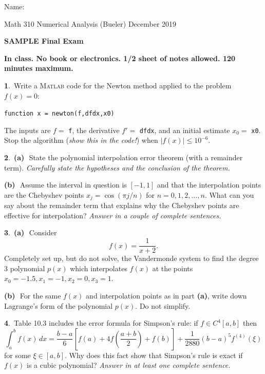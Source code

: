 \documentclass[11pt]{amsart}
\newcommand{\normalspacing}{\renewcommand{\baselinestretch}{1.05}
        \tiny\normalsize}
\newcommand{\prob}[1]{\bigskip\noindent\large\textbf{#1}.\,\normalsize }
\newcommand{\ppart}[1]{\textbf{(#1)}\,\, }
\newcommand{\epart}[1]{\medskip\noindent\textbf{(#1)}\,\, }
\newcommand{\pts}[1]{}
\newcommand{\Matlab}{\textsc{Matlab}\xspace}
\begin{document}
\hfill \Large Name:\underline{\phantom{Ed Bueler really really long long long name}}
\medskip

\scriptsize \noindent Math 310 Numerical Analysis (Bueler) \hfill December 2019
\medskip

\Large\centerline{\textbf{SAMPLE Final Exam}}

\smallskip
\large
\begin{center}
\textbf{In class.  No book or electronics.  1/2 sheet of notes allowed.  120 minutes maximum.}
\end{center}

\bigskip
\thispagestyle{empty}
\normalspacing

\prob{1} \pts{10} Write a \Matlab code for the Newton method applied to the problem $f(x)=0$:

\centerline{\texttt{function x = newton(f,dfdx,x0)}}

\noindent The inputs are $f=$ \texttt{f}, the derivative $f'=$ \texttt{dfdx}, and an initial estimate $x_0=$ \texttt{x0}.  Stop the algorithm (\emph{show this in the code!}) when $|f(x)| \le 10^{-6}$.
\vfill


\prob{2} \ppart{a} \pts{10} State the polynomial interpolation error theorem (with a remainder term).  \emph{Carefully state the hypotheses \emph{and} the conclusion of the theorem.}
\vspace{2.0in}

\epart{b} \pts{5}  Assume the interval in question is $[-1,1]$ and that the interpolation points are the Chebyshev points $x_j = \cos(\pi j/n)$ for $n=0,1,2,\dots,n$.  What can you say about the remainder term that explains why the Chebyshev points are effective for interpolation?  \emph{Answer in a couple of complete sentences.}
\vspace{1.0in}


\newpage
\prob{3} \ppart{a} \pts{10}   Consider
  $$f(x) = \frac{1}{x+2}.$$
Completely set up, but do not solve, the Vandermonde system to find the degree 3 polynomial $p(x)$ which interpolates $f(x)$ at the points $x_0=-1.5,x_1=-1,x_2=0,x_3=1$.
\vfill

\epart{b} \pts{10}  For the same $f(x)$ and interpolation points as in part \textbf{(a)}, write down Lagrange's form of the polynomial $p(x)$.   Do not simplify.
\vfill

\prob{4}  \pts{10}   Table 10.3 includes the error formula for Simpson's rule: if $f \in C^4[a,b]$ then
	$$\int_a^b f(x)\,dx = \frac{b-a}{6} \left[f(a) + 4 f\left(\frac{a+b}{2}\right) + f(b)\right] + \frac{1}{2880} (b-a)^5 f^{(4)}(\xi)$$
for some $\xi \in [a,b]$.  Why does this fact show that Simpson's rule is exact if $f(x)$ is a cubic polynomial?  \emph{Answer in at least one complete sentence.}
\vfill
\end{document}
